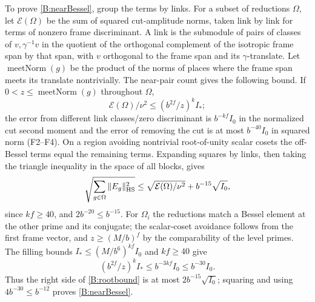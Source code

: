 To prove \eqref{B:nearBessel}, group the terms by links.
For a subset of reductions \(\Omega\),
let \(\mathcal E(\Omega)\) be the sum of squared cut-amplitude norms, taken
link by link for terms of nonzero frame discriminant. A link
is the submodule of pairs of classes of \(v,\gamma^{-1}v\) in
the quotient of the orthogonal complement of the isotropic frame
span by that span, with \(v\) orthogonal to the frame span and
its \(\gamma\)-translate. Let \(\operatorname{meetNorm}(g)\)
be the product of the norms of places where the frame span
meets its translate nontrivially. The near-pair count gives the following bound. If \(0<z\le\operatorname{meetNorm}(g)\) throughout \(\Omega\),
\[
 \mathcal E(\Omega)/\nu^2\le (b^{2f}/z)^k I_*;
\]
the error from different link classes/zero discriminant is
\(b^{-kf}I_0\) in the normalized cut second moment and the
error of removing the cut is at most \(b^{-40}I_0\) in squared
norm (F2--F4). On a region avoiding nontrivial root-of-unity
scalar cosets the off-Bessel terms equal the remaining terms.
Expanding squares by links, then taking the triangle inequality
in the space of all blocks, gives
\begin{equation}
\label{B:rootbound}
 \sqrt{\sum_{g\in\Omega}\|E_g\|_{\rm HS}^2}
 \le\sqrt{\mathcal E(\Omega)/\nu^2}+ b^{-15}\sqrt{I_0},
\end{equation}
since \(kf\ge40\), and \(2b^{-20}\le b^{-15}\).
For \(\Omega_i\) the reductions match a Bessel element at the
other prime and its conjugate; the scalar-coset avoidance
follows from the first frame vector, and
\(z\ge(M/b)^f\) by the comparability of the level primes.
The filling bounds \(I_*\le(M/b^6)^{kf}I_0\) and \(kf\ge40\)
give
\[
 (b^{2f}/z)^k I_*\le b^{-3kf}I_0\le b^{-30}I_0.
\]
Thus the right side of \eqref{B:rootbound} is at most
\(2b^{-15}\sqrt{I_0}\); squaring and using \(4b^{-30}\le b^{-12}\)
proves \eqref{B:nearBessel}.

